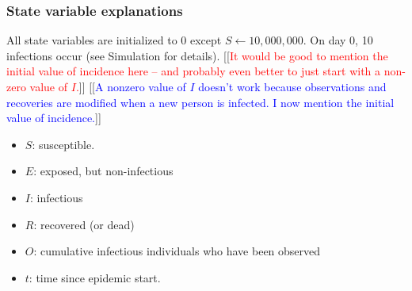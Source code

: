 \documentclass{article}
\newcommand{\jd}[1]{[[\textcolor{red}{#1}]]}  \newcommand{\msComment}[1]{[[\textcolor{blue}{#1}]]}
\newcommand{\jd}[1]{} \newcommand{\msComment}[1]{}
\begin{document}
\subsubsection{State variable explanations}
All state variables are initialized to 0 except $S \gets 10,000,000$. On day 0, 10 infections occur (see Simulation for details). 
\jd{It would be good to mention the initial value of incidence here -- and probably even better to just start with a non-zero value of $I$.} \msComment{A nonzero value of $I$ doesn't work because observations and recoveries are modified when a new person is infected. I now mention the initial value of incidence.}

\begin{itemize}
    \item $S$: susceptible.
    \item $E$: exposed, but non-infectious
    \item $I$: infectious
    \item $R$: recovered (or dead)
    \item $O$: cumulative infectious individuals who have been observed 
    \item $t$: time since epidemic start.
\end{itemize}
\end{document}
